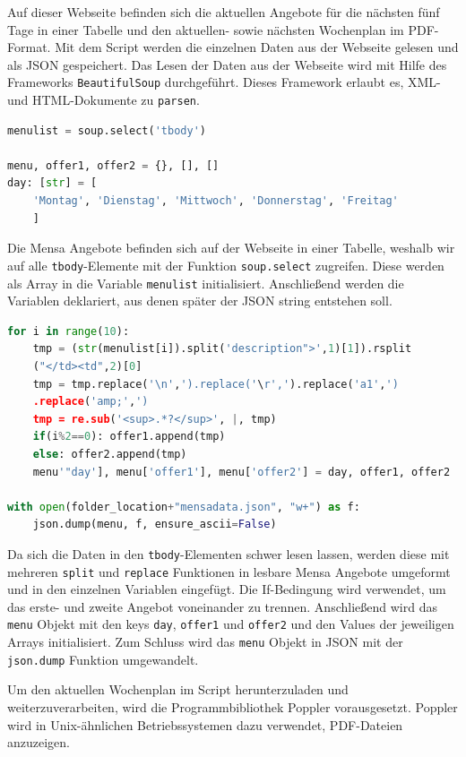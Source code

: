 Auf dieser Webseite befinden sich die aktuellen Angebote für die nächsten fünf Tage in einer Tabelle und den aktuellen- sowie nächsten Wochenplan im PDF-Format. Mit dem Script werden die einzelnen Daten aus der Webseite gelesen und als JSON gespeichert. Das Lesen der Daten aus der Webseite wird mit Hilfe des Frameworks \verb|BeautifulSoup| durchgeführt. Dieses Framework erlaubt es, XML- und HTML-Dokumente zu \verb|parsen|.\\

\begin{lstlisting}[language=Python]
menulist = soup.select('tbody')

menu, offer1, offer2 = {}, [], []
day: [str] = [
    'Montag', 'Dienstag', 'Mittwoch', 'Donnerstag', 'Freitag'
    ]
\end{lstlisting}

Die Mensa Angebote befinden sich auf der Webseite in einer Tabelle, weshalb wir auf alle \verb|tbody|-Elemente mit der Funktion \verb|soup.select| zugreifen. Diese werden als Array in die Variable \verb|menulist| initialisiert. Anschließend werden die Variablen deklariert, aus denen später der JSON string entstehen soll. \\

\begin{lstlisting}[language=Python]
for i in range(10):
    tmp = (str(menulist[i]).split('description">',1)[1]).rsplit
    ("</td><td",2)[0]
    tmp = tmp.replace('\n',').replace('\r',').replace('a1',')
    .replace('amp;',')
    tmp = re.sub('<sup>.*?</sup>', |, tmp)
    if(i%2==0): offer1.append(tmp)
    else: offer2.append(tmp)
    menu'"day'], menu['offer1'], menu['offer2'] = day, offer1, offer2

with open(folder_location+"mensadata.json", "w+") as f:
    json.dump(menu, f, ensure_ascii=False)
\end{lstlisting}

Da sich die Daten in den \verb|tbody|-Elementen schwer lesen lassen, werden diese mit mehreren \verb|split| und \verb|replace| Funktionen in lesbare Mensa Angebote umgeformt und in den einzelnen Variablen eingefügt. Die If-Bedingung wird verwendet, um das erste- und zweite Angebot voneinander zu trennen. Anschließend wird das \verb|menu| Objekt mit den keys \verb|day|, \verb|offer1| und \verb|offer2| und den Values der jeweiligen Arrays initialisiert.
Zum Schluss wird das \verb|menu| Objekt in JSON mit der \verb|json.dump| Funktion umgewandelt.

Um den aktuellen Wochenplan im Script herunterzuladen und weiterzuverarbeiten, wird die Programmbibliothek Poppler vorausgesetzt. Poppler wird in Unix-ähnlichen Betriebssystemen dazu verwendet, PDF-Dateien anzuzeigen.\\

